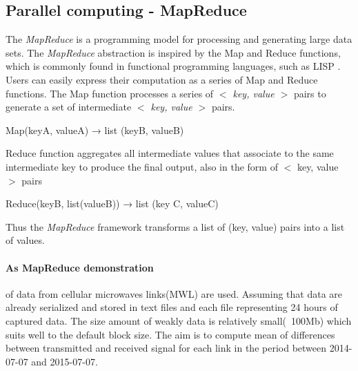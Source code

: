 \documentclass[a4paper,12pt,oneside]{report}
\begin{document}
	
	\subsection{Parallel computing - MapReduce}		
	The \emph{MapReduce} is a programming model for processing and generating large
	data
	sets. The \emph{MapReduce} abstraction is inspired by the Map and Reduce
	functions, which is commonly
	found in functional programming languages, such as LISP \cite{lisp}. Users can
	easily express their
	computation as a series of Map and Reduce functions. The Map function processes
	a series of
	\textit{$<$ key, value $>$} pairs to generate a set of intermediate \textit{$<$
		key, value $>$} pairs.
	\begin{center}
		Map(keyA, valueA) → list (keyB, valueB)
	\end{center}
	Reduce function aggregates all intermediate values that associate to the same
	intermediate key
	to produce the final output, also in the form of $<$ key, value $>$ pairs
	\begin{center}
		Reduce(keyB, list(valueB)) → list (key C, valueC)
	\end{center}
	Thus the \emph{MapReduce} framework transforms a list of (key, value) pairs into
	a list of values. 
	
	
	\paragraph{As MapReduce demonstration} of  data from cellular microwaves
	links(MWL) are used.
	Assuming that data are already serialized and stored in text files and each file
	representing 24 hours 
	of captured data. The size amount of weakly data is relatively small(~100Mb)
	which suits well to the default block size.
	The aim is to compute  mean of differences between transmitted and received
	signal for 
	each link in the period between 2014-07-07 and 2015-07-07.
	
\end{document}

